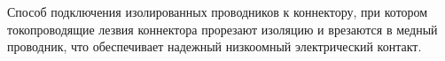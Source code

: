 Способ подключения изолированных проводников к 
коннектору, при котором токопроводящие лезвия
коннектора прорезают изоляцию и врезаются в
медный проводник, что обеспечивает надежный
низкоомный электрический контакт.